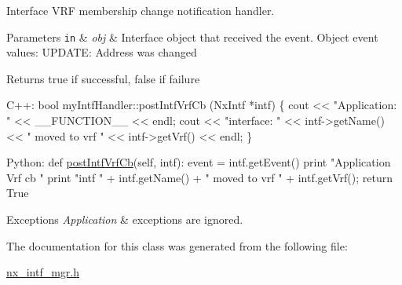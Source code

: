 Interface V\+RF membership change notification handler. 
\begin{DoxyParams}[1]{Parameters}
\mbox{\tt in}  & {\em obj} & Interface object that received the event. Object event values\+: U\+P\+D\+A\+TE\+: Address was changed \\
\hline
\end{DoxyParams}
\begin{DoxyReturn}{Returns}
true if successful, false if failure
\end{DoxyReturn}

\begin{DoxyCode}
C++:
    \textcolor{keywordtype}{bool}  myIntfHandler::postIntfVrfCb (NxIntf *intf)
    \{
        cout << \textcolor{stringliteral}{"Application: "} << \_\_FUNCTION\_\_ << endl;
        cout << \textcolor{stringliteral}{"interface: "} << intf->getName() << 
             \textcolor{stringliteral}{" moved to vrf "} <<  intf->getVrf() << endl;
    \}

Python:   
    def \mbox{\hyperlink{classnxos_1_1_nx_intf_mgr_handler_aa6f8bc5b1cfa6d99e863c8ede3cafa5f}{postIntfVrfCb}}(\textcolor{keyword}{self}, intf):
        event = intf.getEvent()
        print \textcolor{stringliteral}{"Application Vrf cb "} 
        print \textcolor{stringliteral}{"intf "} + intf.getName() + \textcolor{stringliteral}{" moved to vrf "} 
                + intf.getVrf();
        \textcolor{keywordflow}{return} True
\end{DoxyCode}



\begin{DoxyExceptions}{Exceptions}
{\em Application} & exceptions are ignored. \\
\hline
\end{DoxyExceptions}


The documentation for this class was generated from the following file\+:\begin{DoxyCompactItemize}
\item 
\mbox{\hyperlink{nx__intf__mgr_8h}{nx\+\_\+intf\+\_\+mgr.\+h}}\end{DoxyCompactItemize}
